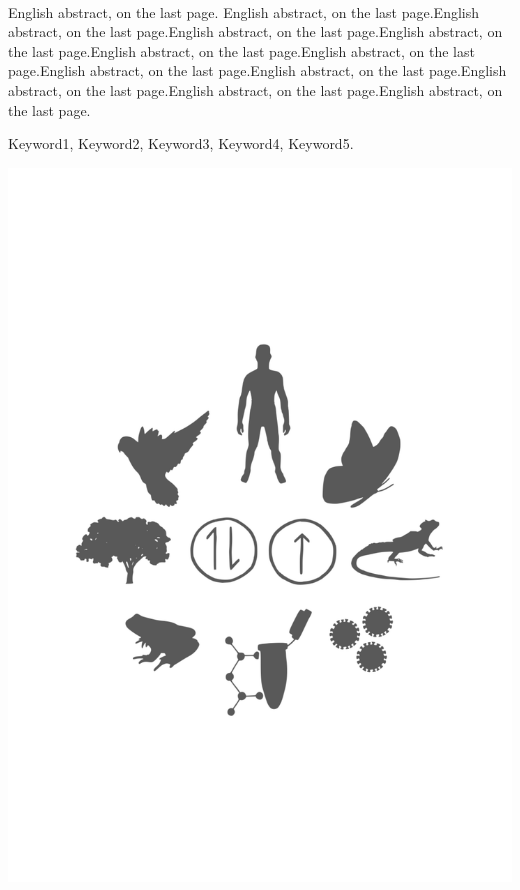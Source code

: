 \documentclass[
  9pt,
  american,
  a5paper,
  extrafontsizes,onecolumn,openright
  ]{memoir}
\makeatletter
\newcommand{\MemoirChapStyle}{daleif1}
\newcommand{\MemoirPageStyle}{Ruled}
\newlength\widthw %
\newcommand*{\SmallMargins}{
  \setlrmarginsandblock{0.75in}{0.75in}{*}
  \setmarginnotes{0.1in}{0.1in}{0.1in}
 \setulmarginsandblock{0.75in}{0.75in}{*}
  \checkandfixthelayout
  \ch@ngetext
  \clearpage
  \setlength{\widthw}{\textwidth+\marginparsep+\marginparwidth}
  \footnotesatfoot
  \chapterstyle{\MemoirChapStyle}  %
  \pagestyle{\MemoirPageStyle}
}
\newcommand{\evenpage}{
  \clearpage
  \strictpagecheck %
  \checkoddpage
  \ifoddpage
    \thispagestyle{empty}
    ~\\ %
    \newpage
  \else
  \fi
}
\makeatother
\begin{document}
\printbibliography
\onecolumn











\evenpage
\SmallMargins
\thispagestyle{empty}

\begin{normalsize}

\begin{description}

\item[Abstract]
English abstract, on the last page. English abstract, on the last page.English abstract, on the last page.English abstract, on the last page.English abstract, on the last page.English abstract, on the last page.English abstract, on the last page.English abstract, on the last page.English abstract, on the last page.English abstract, on the last page.English abstract, on the last page.English abstract, on the last page.
\item[Keywords]
Keyword1, Keyword2, Keyword3, Keyword4, Keyword5.
~\\

\end{description}

\end{normalsize}

\vspace*{\fill}
\centering\includegraphics[width=.3\textwidth]{images/logo}
\end{document}
